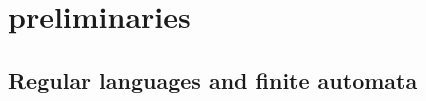 
\section{preliminaries}\label{sec:preliminaries}

\subsection{Regular languages and finite automata}


